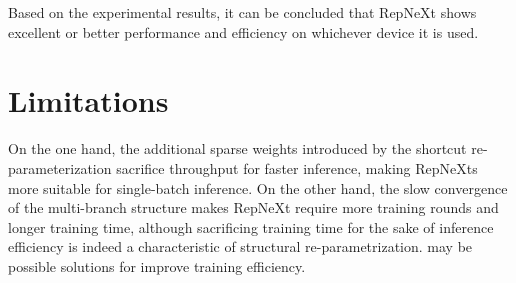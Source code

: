 \documentclass[preprint,12pt]{elsarticle}
\begin{document}
Based on the experimental results, it can be concluded that RepNeXt shows excellent or better performance and efficiency on whichever device it is used.

\begin{table}[h]
\centering
\small
\begin{adjustbox}{center}
\end{adjustbox}
\caption{Comparison of metrics with models on different hardware devices. The CPU is Intel(R) Xeon(R) Platinum 8260, the GPU device is NVIDIA A100, the edge device is NVIDIA Jetson Orin. Latency (Lat.) is in milliseconds, and throughput (Thr.) is in images/s. Regular and shortcut type re-parameterization are noted as rRep and sRep.}
\label{tab2}
\end{table}

\section{Limitations}
\label{sec:limitations}

On the one hand, the additional sparse weights introduced by the shortcut re-parameterization sacrifice throughput for faster inference, making RepNeXts more suitable for single-batch inference. On the other hand, the slow convergence of the multi-branch structure makes RepNeXt require more training rounds and longer training time, although sacrificing training time for the sake of inference efficiency is indeed a characteristic of structural re-parametrization. \cite{online} may be possible solutions for improve training efficiency.
\end{document}
